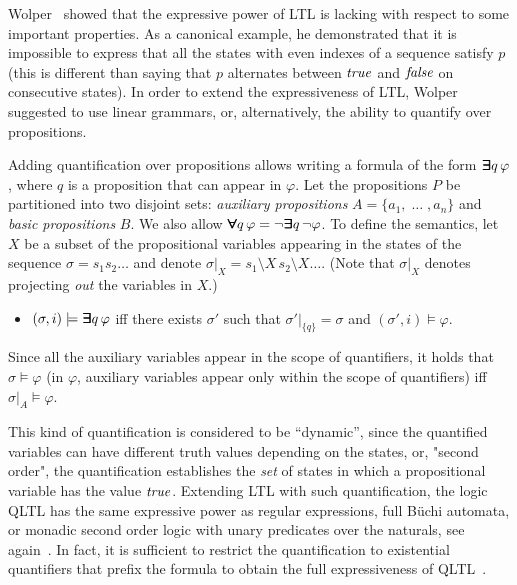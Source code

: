 Wolper~\cite{Wolper} showed that the expressive power of LTL is lacking with respect
to some important properties. As a canonical example, he demonstrated that it is impossible to
express that all the states with even indexes of a sequence
satisfy $p$ (this is
different than saying that $p$ alternates between $\mathit{true}$ and $\mathit{false}$ on consecutive states). In order to extend the expressiveness of LTL, Wolper suggested to use linear grammars, or, alternatively, the ability to quantify over
propositions. 


Adding quantification over propositions allows writing a formula of the form
$\bm{\exists}\kern-0.6em\bm{\exists} q \, \varphi$, where $q$ is a proposition that can appear in $\varphi$.
Let the propositions $P$ be partitioned into two disjoint sets: 
{\em auxiliary propositions} $A = \{ a_1 , \; \ldots\; , a_n \}$
and {\em basic propositions} $B$. 
We also allow $\bm{\forall}\kern-0.6em\bm{\forall} q\, \varphi =
\neg \bm{\exists}\kern-0.6em\bm{\exists} q\, \neg \varphi$.
To define the semantics, let $X$ be a subset of 
the propositional variables appearing in the states of the sequence $\sigma = s_1 s_2 \ldots$ and 
denote $\sigma |_X = s_1 \setminus X \, s_2 \setminus X \ldots$. (Note that $\sigma |_X$ denotes projecting {\em out} the variables in $X$.)



\begin{itemize}
\item $( \sigma, i ) \models \boldsymbol{\bm{\exists}\kern-0.6em\bm{\exists}} q \, \varphi$ iff there exists
$\sigma'$ such that $\sigma' |_{\{ q \} } = \sigma$ and 
$( \sigma', i) \models \varphi$.
\end{itemize}
Since all the auxiliary variables appear in the scope of
quantifiers, it holds that $\sigma \models \varphi$
(in $\varphi$, auxiliary variables appear only within
the scope of quantifiers)
iff $\sigma |_A \models \varphi$.

This kind of quantification is considered to be ``dynamic'', since the quantified variables can have different truth values depending on the states, or, "second order", the quantification establishes the {\em set} of states in which a propositional variable has the value $\mathit{true}$.
Extending LTL with such quantification, the logic QLTL has the same expressive power as regular expressions, full B\"{u}chi
automata, or monadic second order logic with unary predicates over the naturals, see again~\cite{Thomas}.
In fact, it is sufficient to restrict the quantification to existential quantifiers that prefix the formula to obtain the full expressiveness of QLTL~\cite{Thomas}. 


